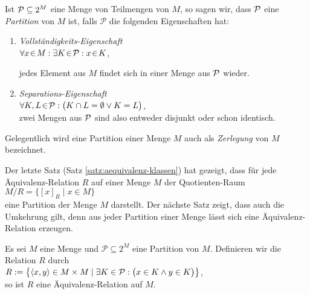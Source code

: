 \begin{Definition}[Partition] 
Ist ${\cal P} \subseteq 2^M$ eine Menge von Teilmengen von $M$, so sagen wir, dass ${\cal P}$ eine 
\emph{Partition} von $M$ ist, falls $\mathcal{P}$ die folgenden Eigenschaften hat:
\begin{enumerate}
\item \emph{Vollst\"{a}ndigkeits-Eigenschaft} 
      \\[0.2cm]
      \hspace*{1.3cm}
      $\forall x \!\in\! M : \exists K \!\in\! {\cal P} : x \!\in\! K$,

      jedes Element aus $M$ findet sich  in einer Menge aus ${\cal P}$ wieder.
\item \emph{Separations-Eigenschaft} 
      \\[0.2cm]
      \hspace*{1.3cm}
      $\forall K, L \!\in\! {\cal P} : \bigl(K \cap L =\emptyset \vee K = L\bigr)$,
      \\[0.2cm]
      zwei Mengen aus ${\cal P}$ sind also entweder disjunkt oder schon identisch.
\end{enumerate}
Gelegentlich wird eine Partition einer Menge $M$ auch als \emph{Zerlegung} von $M$
bezeichnet. \eox
\end{Definition}

\remark
Der letzte Satz (Satz \ref{satz:aequivalenz-klassen}) hat gezeigt, dass f\"{u}r jede \"{A}quivalenz-Relation
$R$ auf einer Menge $M$ der Quotienten-Raum 
\\[0.2cm]
\hspace*{1.3cm}
$M/R = \bigl\{ [x]_R \mid x \in M \bigr\}$
\\[0.2cm]
eine Partition der Menge $M$ darstellt.  Der n\"{a}chste Satz zeigt, dass auch die Umkehrung gilt, denn
aus jeder Partition einer Menge l\"{a}sst sich eine \"{A}quivalenz-Relation erzeugen.
\eox

\begin{Satz} 
Es sei $M$ eine Menge und $\mathcal{P} \subseteq 2^M$ eine
Partition von $M$.  Definieren wir die Relation $R$ durch
\\[0.2cm]
\hspace*{1.3cm}
$R := \bigl\{ \pair(x,y) \in M \times M \mid \exists K \in \mathcal{P}: \bigl(x \in K \wedge y \in K\bigr) \bigr\}$,
\\[0.2cm]
so ist $R$ eine \"{A}quivalenz-Relation auf $M$.
\end{Satz}

